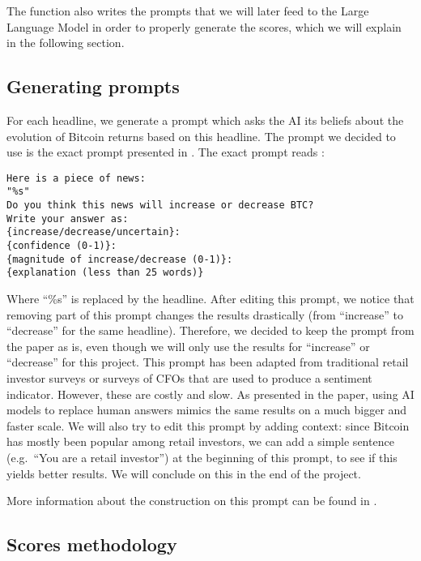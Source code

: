 \documentclass[
  a4paper]{article}
\begin{document}
The function also writes the prompts that we will later feed to the
Large Language Model in order to properly generate the scores, which we
will explain in the following section.

\hypertarget{generating-prompts}{%
\subsection{Generating prompts}\label{generating-prompts}}

For each headline, we generate a prompt which asks the AI its beliefs
about the evolution of Bitcoin returns based on this headline. The
prompt we decided to use is the exact prompt presented in
\textcite{leland_bybee_2025} . The exact prompt reads :

\begin{verbatim}
Here is a piece of news:
"%s"
Do you think this news will increase or decrease BTC?
Write your answer as: 
{increase/decrease/uncertain}:
{confidence (0-1)}:
{magnitude of increase/decrease (0-1)}:
{explanation (less than 25 words)}
\end{verbatim}

Where ``\%s'' is replaced by the headline. After editing this prompt, we
notice that removing part of this prompt changes the results drastically
(from ``increase'' to ``decrease'' for the same headline). Therefore, we
decided to keep the prompt from the paper as is, even though we will
only use the results for ``increase'' or ``decrease'' for this project.
This prompt has been adapted from traditional retail investor surveys or
surveys of CFOs that are used to produce a sentiment indicator. However,
these are costly and slow. As presented in the paper, using AI models to
replace human answers mimics the same results on a much bigger and
faster scale. We will also try to edit this prompt by adding context:
since Bitcoin has mostly been popular among retail investors, we can add
a simple sentence (e.g.~``You are a retail investor'') at the beginning
of this prompt, to see if this yields better results. We will conclude
on this in the end of the project.

More information about the construction on this prompt can be found in
\textcite{leland_bybee_2025} .

\hypertarget{scores-methodology}{%
\subsection{Scores methodology}\label{scores-methodology}}
\end{document}
